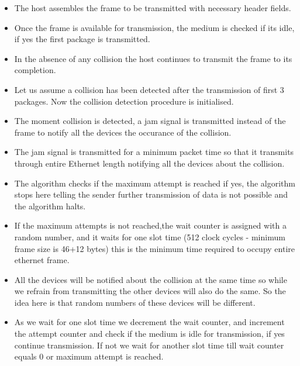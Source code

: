 \documentclass{resources/WeSTassignment}
\begin{document}
\begin{itemize}
\item The host assembles the frame to be transmitted with necessary header fields.
\item Once the frame is available for transmission, the medium is checked if its idle, if yes the first package is transmitted.
\item In the absence of any collision the host continues to transmit the frame to its completion.
\item Let us assume a collision has been detected after the transmission of first 3 packages. Now the collision detection procedure is initialised.
\item The moment collision is detected, a jam signal is transmitted instead of the frame to notify all the devices the occurance of the collision.
\item The jam signal is transmitted for a minimum packet time so that it transmits through entire Ethernet length notifying all the devices about the collision. 
\item The algorithm checks if the maximum attempt is reached if yes, the algorithm stops here telling the sender further transmission of data is not possible and the algorithm halts.
\item If the maximum attempts is not reached,the wait counter is assigned with a random number, and it waits for one slot time (512 clock cycles - minimum frame size is 46+12 bytes) this is the minimum time required to occupy entire ethernet frame.
\item All the devices will be notified about the collision at the same time so while we refrain from transmitting the other devices will also do the same. So the idea here is that random numbers of these devices will be different.
\item As we wait for one slot time we decrement the wait counter, and increment the attempt counter and check if the medium is idle for transmission, if yes continue transmission. If not we wait for another slot time till wait counter equals 0 or maximum attempt is reached.
\end{itemize}
\end{document}
